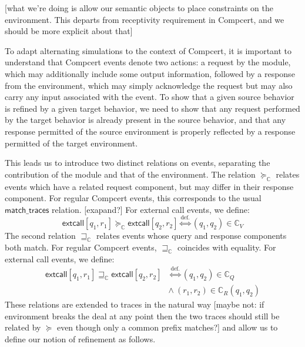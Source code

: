 \documentclass[acmsmall,10pt,review,anonymous]{acmart}
\newcommand{\kw}[1]{\ensuremath{ \textsf{#1} }}
\begin{document}
[what we're doing
is allow our semantic objects
to place constraints on the environment.
This departs from receptivity requirement in Compcert,
and we should be more explicit about that]

To adapt alternating simulations to the context of Compcert,
it is important to understand that Compcert events
denote two actions:
a request by the module,
which may additionally include some output information,
followed by a response from the environment,
which may simply acknowledge the request
but may also carry any input associated with the event.
To show that
a given source behavior is refined by
a given target behavior,
we need to show that any request performed by the target behavior
is already present in the source behavior,
and that any response permitted of the source environment
is properly reflected by
a response permitted of the target environment.

This leads us to introduce two distinct relations on events,
separating the contribution of the module and that of the environment.
The relation $\succeq_\mathbb{C}$
relates events
which have a related request component,
but may differ in their response component.
For regular Compcert events,
this corresponds to the usual $\kw{match\_traces}$ relation.
[exapand?]
For external call events, we define:
\[
  \kw{extcall}[q_1, r_1] \succeq_\mathbb{C} \kw{extcall}[q_2, r_2]
  \stackrel{\text{def.}}{\Leftrightarrow}
  (q_1, q_2) \in \mathbb{C}_V
\]
The second relation $\sqsupseteq_\mathbb{C}$
relates events whose query and response components
both match.
For regular Compcert events,
$\sqsupseteq_\mathbb{C}$ coincides with equality.
For external call events, we define:
\begin{align*}
  \kw{extcall}[q_1, r_1] \sqsupseteq_\mathbb{C} \kw{extcall}[q_2, r_2]
  &\stackrel{\text{def.}}{\Leftrightarrow}
  (q_1, q_2) \in \mathbb{C}_Q \\ &\wedge \ 
  (r_1, r_2) \in \mathbb{C}_R(q_1, q_2)
\end{align*}
These relations are extended to traces in the natural way
[maybe not: if environment breaks the deal at any point
then the two traces should still be related by $\succeq$
even though only a common prefix matches?]
and allow us to define
our notion of refinement as follows.
\end{document}

